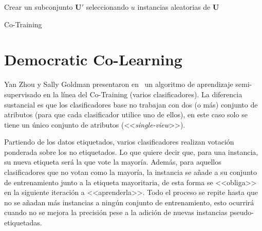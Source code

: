 \begin{algorithm}
    \DontPrintSemicolon
    Crear un subconjunto $\pmb{U'}$ seleccionando $u$ instancias aleatorias de $\pmb{U}$\;
     \caption{Co-Training}\label{pseudo:co-training}
\end{algorithm}

\clearpage
\section{Democratic Co-Learning}

Yan Zhou y Sally Goldman presentaron en~\cite{zhou2004democratic} un algoritmo
de aprendizaje semi-supervisado en la línea del Co-Training (varios
clasificadores). La diferencia sustancial es que los clasificadores base no
trabajan con dos (o más) conjunto de atributos (para que cada clasificador
utilice uno de ellos), en este caso solo se tiene un único conjunto de atributos
(<<\emph{single-view}>>).

Partiendo de los datos etiquetados, varios clasificadores realizan votación
ponderada sobre los no etiquetados. Lo que quiere decir que, para una instancia,
su nueva etiqueta será la que vote la mayoría. Además, para aquellos
clasificadores que no votan como la mayoría, la instancia se añade a su conjunto
de entrenamiento junto a la etiqueta mayoritaria, de esta forma se <<obliga>> en
la siguiente iteración a <<aprenderla>>. Todo el proceso se repite hasta que no
se añadan más instancias a ningún conjunto de entrenamiento, esto ocurrirá
cuando no se mejora la precisión pese a la adición de nuevas instancias
pseudo-etiquetadas.

